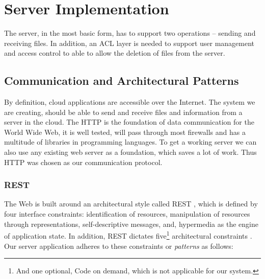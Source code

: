 \documentclass[pdftex,english,10pt,b5paper,twoside]{book}
\begin{document}
\section{Server Implementation}

The server, in the most basic form, has to support two operations -- sending
and receiving files. In addition, an \ac{ACL} layer is needed to support user
management and access control to able to allow the deletion of files from the
server.

\subsection{Communication and Architectural Patterns}

By definition, cloud applications are accessible over the Internet. The system
we are creating, should be able to send and receive files and information from
a server in the cloud. The \acf{HTTP} is the foundation of data communication
for the World Wide Web, it is well tested, will pass through most firewalls and
has a multitude of libraries in programming languages. To get a working server
we can also use any existing web server as a foundation, which saves a lot of
work. Thus \ac{HTTP} was chosen as our communication protocol.

\subsubsection{\acs{REST}} The Web is built around an architectural style called
\ac{REST} \cite[ch. 5]{fielding}, which is defined by four interface
constraints: identification of resources, manipulation of resources through
representations, self-descriptive messages, and, hypermedia as the engine of
application state. In addition, \ac{REST} dictates five\footnote{And one
optional, Code on demand, which is not applicable for our system.} architectural
constraints \cite{fielding}. Our server application adheres to these
constraints or \emph{patterns} as follows:
\end{document}
